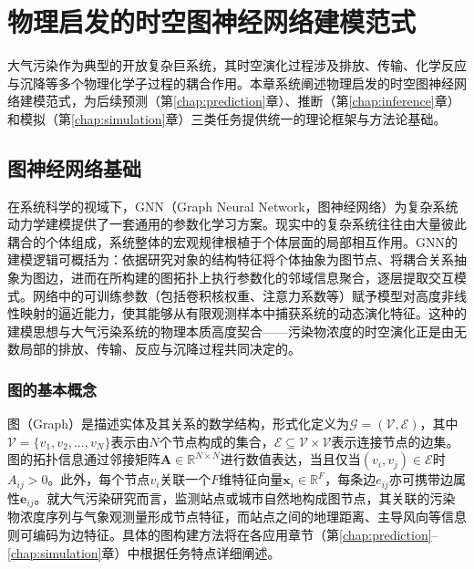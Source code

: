 
\chapter{物理启发的时空图神经网络建模范式}
\label{chap:methodology}

大气污染作为典型的开放复杂巨系统，其时空演化过程涉及排放、传输、化学反应与沉降等多个物理化学子过程的耦合作用。本章系统阐述物理启发的时空图神经网络建模范式，为后续预测（第\ref{chap:prediction}章）、推断（第\ref{chap:inference}章）和模拟（第\ref{chap:simulation}章）三类任务提供统一的理论框架与方法论基础。

\section{图神经网络基础}
\label{sec:gnn_basics}

在系统科学的视域下，GNN（Graph Neural Network，图神经网络）为复杂系统动力学建模提供了一套通用的参数化学习方案\citep{battaglia2018relational}。现实中的复杂系统往往由大量彼此耦合的个体组成，系统整体的宏观规律根植于个体层面的局部相互作用。GNN的建模逻辑可概括为：依据研究对象的结构特征将个体抽象为图节点、将耦合关系抽象为图边，进而在所构建的图拓扑上执行参数化的邻域信息聚合，逐层提取交互模式。网络中的可训练参数（包括卷积核权重、注意力系数等）赋予模型对高度非线性映射的逼近能力，使其能够从有限观测样本中捕获系统的动态演化特征。这种的建模思想与大气污染系统的物理本质高度契合——污染物浓度的时空演化正是由无数局部的排放、传输、反应与沉降过程共同决定的。

\subsection{图的基本概念}
\label{subsec:graph_concept}

图（Graph）是描述实体及其关系的数学结构，形式化定义为$\mathcal{G} = (\mathcal{V}, \mathcal{E})$，其中$\mathcal{V} = \{v_1, v_2, \ldots, v_N\}$表示由$N$个节点构成的集合，$\mathcal{E} \subseteq \mathcal{V} \times \mathcal{V}$表示连接节点的边集。图的拓扑信息通过邻接矩阵$\mathbf{A} \in \mathbb{R}^{N \times N}$进行数值表达，当且仅当$(v_i, v_j) \in \mathcal{E}$时$A_{ij} > 0$。此外，每个节点$v_i$关联一个$F$维特征向量$\mathbf{x}_i \in \mathbb{R}^{F}$，每条边$e_{ij}$亦可携带边属性$\mathbf{e}_{ij}$。就大气污染研究而言，监测站点或城市自然地构成图节点，其关联的污染物浓度序列与气象观测量形成节点特征，而站点之间的地理距离、主导风向等信息则可编码为边特征。具体的图构建方法将在各应用章节（第\ref{chap:prediction}--\ref{chap:simulation}章）中根据任务特点详细阐述。

